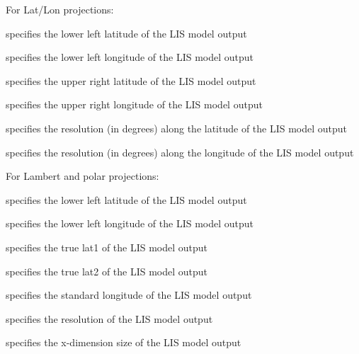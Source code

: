   

  

  

  

  

 For Lat/Lon projections:

 specifies the lower left latitude of the LIS model output

 specifies the lower left longitude of the LIS model output

 specifies the upper right latitude of the LIS model output

 specifies the upper right longitude of the LIS model output

 specifies the resolution (in degrees) along the latitude of the
 LIS model output

 specifies the resolution (in degrees) along the longitude of the
 LIS model output

 For Lambert and polar projections:

 specifies the lower left latitude of the LIS model output

 specifies the lower left longitude of the LIS model output

 specifies the true lat1 of the LIS model output

 specifies the true lat2 of the LIS model output

 specifies the standard longitude of the LIS model output

 specifies the resolution of the LIS model output

 specifies the x-dimension size of the LIS model output

